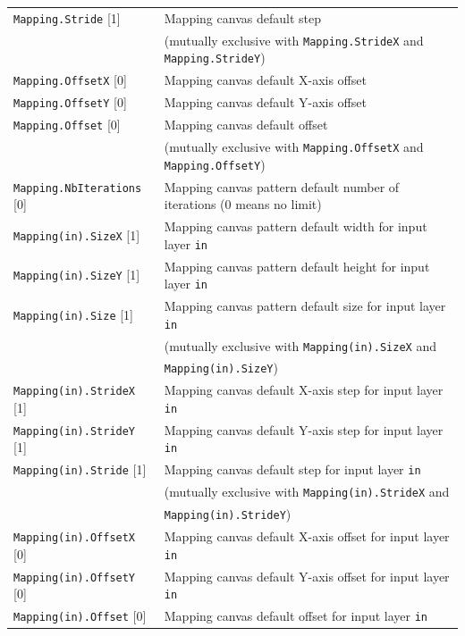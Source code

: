 \documentclass[a4paper,11pt,oneside]{article}
\begin{document}
\begin{center}
\begin{longtable}{| p{5cm} | p{10cm} | }
  \lstinline!Mapping.Stride! [1] & Mapping canvas default step \\
   & (mutually exclusive with \lstinline!Mapping.StrideX!
   and \lstinline!Mapping.StrideY!) \\
  \lstinline!Mapping.OffsetX! [0] & Mapping canvas default X-axis offset \\
  \lstinline!Mapping.OffsetY! [0] & Mapping canvas default Y-axis offset \\
  \lstinline!Mapping.Offset! [0] & Mapping canvas default offset \\
   & (mutually exclusive with \lstinline!Mapping.OffsetX!
   and \lstinline!Mapping.OffsetY!) \\
  \lstinline!Mapping.NbIterations! [0] & Mapping canvas pattern default number
  of iterations (0 means no limit) \\
  \lstinline!Mapping(in).SizeX! [1] & Mapping canvas pattern default width
  for input layer \lstinline!in! \\
  \lstinline!Mapping(in).SizeY! [1] & Mapping canvas pattern default height
  for input layer \lstinline!in! \\
  \lstinline!Mapping(in).Size! [1] & Mapping canvas pattern default size
   for input layer \lstinline!in! \\
   & (mutually exclusive with \lstinline!Mapping(in).SizeX! and \\
   & \lstinline!Mapping(in).SizeY!) \\
  \lstinline!Mapping(in).StrideX! [1] & Mapping canvas default X-axis step
  for input layer \lstinline!in! \\
  \lstinline!Mapping(in).StrideY! [1] & Mapping canvas default Y-axis step
  for input layer \lstinline!in! \\
  \lstinline!Mapping(in).Stride! [1] & Mapping canvas default step
   for input layer \lstinline!in! \\
   & (mutually exclusive with \lstinline!Mapping(in).StrideX! and \\
   & \lstinline!Mapping(in).StrideY!) \\
  \lstinline!Mapping(in).OffsetX! [0] & Mapping canvas default X-axis offset
  for input layer \lstinline!in! \\
  \lstinline!Mapping(in).OffsetY! [0] & Mapping canvas default Y-axis offset
  for input layer \lstinline!in! \\
  \lstinline!Mapping(in).Offset! [0] & Mapping canvas default offset
  for input layer \lstinline!in! \\

\end{longtable}
\end{center}
\end{document}

